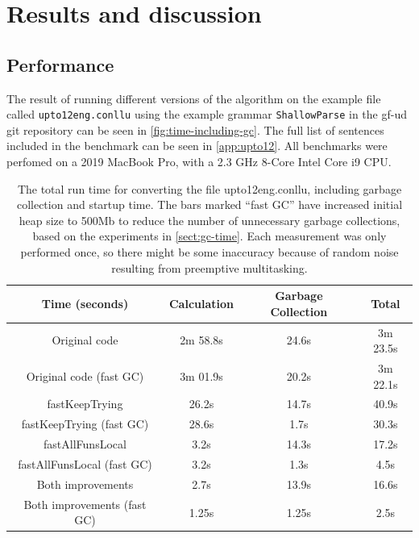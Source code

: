 \chapter{Results and discussion}

\section{Performance}



The result of running different versions of the algorithm on the example file called \texttt{upto12eng.conllu} using the example grammar \texttt{ShallowParse} in the gf-ud git repository can be seen in \autoref{fig:time-including-gc}. The full list of sentences included in the benchmark can be seen in \autoref{app:upto12}. All benchmarks were perfomed on a 2019 MacBook Pro, with a 2.3 GHz 8-Core Intel Core i9 CPU.

\begin{table}[]
    \centering
    \begin{tabular}{c|ccc}
    Time (seconds) & Calculation & Garbage Collection & Total \\
    \hline
    Original code & 2m 58.8s & 24.6s & 3m 23.5s \\
    Original code (fast GC) & 3m 01.9s & 20.2s & 3m 22.1s \\
    fastKeepTrying & 26.2s & 14.7s & 40.9s \\
    fastKeepTrying (fast GC) & 28.6s & 1.7s & 30.3s \\
    fastAllFunsLocal & 3.2s & 14.3s & 17.2s \\
    fastAllFunsLocal (fast GC) & 3.2s & 1.3s & 4.5s \\
    Both improvements & 2.7s & 13.9s & 16.6s \\
    Both improvements (fast GC) & 1.25s & 1.25s & 2.5s \\
    \end{tabular}
    \caption{The total run time for converting the file upto12eng.conllu, including garbage collection and startup time. The bars marked ``fast GC'' have increased initial heap size to 500Mb to reduce the number of unnecessary garbage collections, based on the experiments in \autoref{sect:gc-time}. Each measurement was only performed once, so there might be some inaccuracy because of random noise resulting from preemptive multitasking. }
    \label{tab:time-with-gc}
\end{table}

